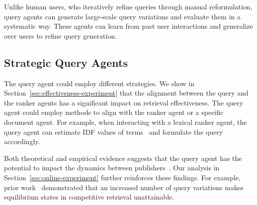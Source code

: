  Unlike human users, who iteratively refine queries through manual reformulation, query agents can generate large-scale query variations and evaluate them in a systematic way. These agents can learn from past user interactions and generalize over users to refine query generation. 

\subsection{Strategic Query Agents}

The query agent could employ different strategies. We show in Section~\ref{sec:effectiveness-experiment} that the alignment between the query and the ranker agents has a significant impact on retrieval effectiveness.
The query agent could employ methods to align with the ranker agent or a specific document agent. For example, when interacting with a lexical ranker agent, the query agent can estimate IDF values of terms~\cite{Yossef+Gurevich:08a} and formulate the query accordingly.


Both theoretical and empirical evidence suggests that the query agent has the potential to impact the dynamics between publishers~\cite{MultQueries}. Our analysis in Section~\ref{sec:online-experiment} further reinforces these findings. For example, prior work~\cite{MultQueries} demonstrated that an increased number of query variations makes equilibrium states in competitive retrieval unattainable. 







